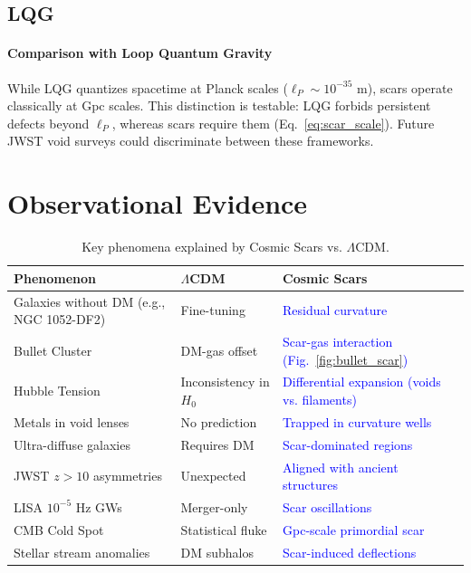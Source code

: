 \documentclass{article}
\begin{document}
\subsection{LQG}
 \paragraph{Comparison with Loop Quantum Gravity}  
   While LQG quantizes spacetime at Planck scales ($\ell_P \sim 10^{-35}$ m), scars operate classically at Gpc scales. This distinction is testable: LQG forbids persistent defects beyond $\ell_P$, whereas scars require them (Eq.~\ref{eq:scar_scale}). Future JWST void surveys could discriminate between these frameworks.   

   
\section{Observational Evidence}
\label{sec:observations}
\begin{table}[H]
\centering
\begin{tabularx}{\textwidth}{l>{\raggedright\arraybackslash}X>{\raggedright\arraybackslash}X}
\hline
\textbf{Phenomenon} & \textbf{$\Lambda$CDM} & \textbf{Cosmic Scars} \\ 
\hline
Galaxies without DM (e.g., NGC 1052-DF2) & Fine-tuning & \textcolor{blue}{Residual curvature} \\
\hline
Bullet Cluster & DM-gas offset & \textcolor{blue}{Scar-gas interaction (Fig.~\ref{fig:bullet_scar})} \\ 
\hline
Hubble Tension & Inconsistency in $H_0$ & \textcolor{blue}{Differential expansion (voids vs. filaments)} \\
\hline
Metals in void lenses & No prediction & \textcolor{blue}{Trapped in curvature wells} \\
\hline
Ultra-diffuse galaxies & Requires DM & \textcolor{blue}{Scar-dominated regions} \\
\hline
JWST $z > 10$ asymmetries & Unexpected & \textcolor{blue}{Aligned with ancient structures} \\
\hline
LISA $10^{-5}$ Hz GWs & Merger-only & \textcolor{blue}{Scar oscillations} \\
\hline
CMB Cold Spot & Statistical fluke & \textcolor{blue}{Gpc-scale primordial scar} \\
\hline
Stellar stream anomalies & DM subhalos & \textcolor{blue}{Scar-induced deflections} \\
\hline
\end{tabularx}
\caption{Key phenomena explained by Cosmic Scars vs. $\Lambda$CDM.}
\label{tab:scars_vs_lcdm}
\end{table}
\end{document}

